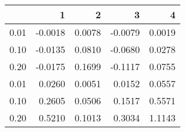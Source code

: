 \begin{tabular}{lrrrr}
\toprule
{} &       1 &       2 &       3 &       4 \\
\midrule
0.01 & -0.0018 &  0.0078 & -0.0079 &  0.0019 \\
0.10 & -0.0135 &  0.0810 & -0.0680 &  0.0278 \\
0.20 & -0.0175 &  0.1699 & -0.1117 &  0.0755 \\
0.01 &  0.0260 &  0.0051 &  0.0152 &  0.0557 \\
0.10 &  0.2605 &  0.0506 &  0.1517 &  0.5571 \\
0.20 &  0.5210 &  0.1013 &  0.3034 &  1.1143 \\
\bottomrule
\end{tabular}
